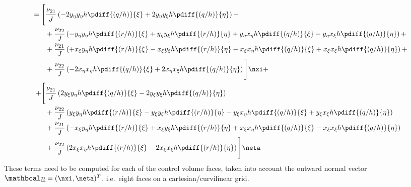\begin{align}
    = \Bigg[ &
    \frac{\nu_{21}}{J} \left(
    - 2 y_{\eta} y_{\eta} h \pdiff{(q/h)}{\xi}
    + 2 y_{\eta} y_{\xi} h \pdiff{(q/h)}{\eta}
    \right)
    +
    \\
    & + \frac{\nu_{22}}{J} \left(
    - y_{\eta} y_{\eta} h \pdiff{(r/h)}{\xi}
    + y_{\eta} y_{\xi} h \pdiff{(r/h)}{\eta}
    + y_{\eta} x_{\eta} h \pdiff{(q/h)}{\xi}
    - y_{\eta} x_{\xi} h \pdiff{(q/h)}{\eta}
    \right)
    +
    \\
    & + \frac{\nu_{21}}{J} \left(
    + x_{\xi} y_{\eta} h \pdiff{(r/h)}{\xi}
    - x_{\xi} y_{\xi} h \pdiff{(r/h)}{\eta}
    - x_{\xi} x_{\eta} h \pdiff{(q/h)}{\xi}
    + x_{\xi} x_{\xi} h \pdiff{(q/h)}{\eta}
    \right)
    +
    \\
    & + \frac{\nu_{22}}{J} \left(
    - 2 x_{\eta} x_{\eta} h \pdiff{(q/h)}{\xi}
    + 2 x_{\eta} x_{\xi} h \pdiff{(q/h)}{\eta}
    \right)
    \Bigg] \nxi +
    \\
    + \Bigg[ &
    \frac{\nu_{21}}{J} \left(
    2 y_{\xi} y_{\eta} h \pdiff{(q/h)}{\xi}
    - 2 y_{\xi} y_{\xi} h \pdiff{(q/h)}{\eta}
    \right)
    \\* & +
    \frac{\nu_{22}}{J} \left(
    y_{\xi}y_{\eta} h \pdiff{(r/h)}{\xi}
    - y_{\xi}y_{\xi} h \pdiff{(r/h)}{\eta}
    - y_{\xi}x_{\eta} h \pdiff{(q/h)}{\xi}
    + y_{\xi}x_{\xi} h \pdiff{(q/h)}{\eta}
    \right)
    \\* & +
    \frac{\nu_{21}}{J} \left(
    - x_{\xi}y_{\eta} h \pdiff{(r/h)}{\xi}
    + x_{\xi}y_{\xi} h \pdiff{(r/h)}{\eta}
    + x_{\xi}x_{\eta} h \pdiff{(q/h)}{\xi}
    - x_{\xi}x_{\xi} h \pdiff{(q/h)}{\eta}
    \right)
    \\* & +
    \frac{\nu_{22}}{J} \left(
    2 x_{\xi}x_{\eta} h \pdiff{(r/h)}{\xi}
    - 2 x_{\xi}x_{\xi} h \pdiff{(r/h)}{\eta}
    \right)
    \Bigg] \neta
\end{align}
%
These terms need to be computed for each of the control volume faces, taken into account the outward normal vector $\vecn = (\nxi, \neta)^T$, i.e.\ eight faces on a cartesian/curvilinear grid.


